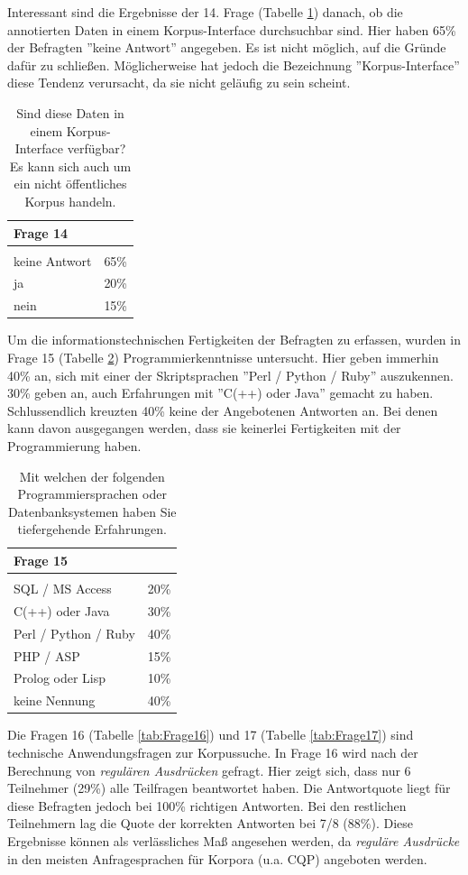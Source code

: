 Interessant sind die Ergebnisse der 14. Frage (Tabelle \ref{tab:Frage14}) danach, ob die annotierten Daten in einem Korpus-Interface durchsuchbar sind. Hier haben 65\% der Befragten ''keine Antwort'' angegeben. Es ist nicht möglich, auf die Gründe dafür zu schließen. Möglicherweise hat jedoch die Bezeichnung ''Korpus-Interface'' diese Tendenz verursacht, da sie nicht geläufig zu sein scheint.

	\begin{table}[H]
		\centering
		\begin{tabular}{l | r}
					Frage 14 &  \\
					\hline\\
					keine Antwort	& 65\% \\
					ja 			& 20\% \\
					nein			& 15\%
		\end{tabular}
		\caption{Sind diese Daten in einem Korpus-Interface verfügbar? Es kann sich auch um ein nicht öffentliches Korpus handeln.} \label{tab:Frage14}
	\end{table}
	
Um die informationstechnischen Fertigkeiten der Befragten zu erfassen, wurden in Frage 15 (Tabelle \ref{tab:Frage15}) Programmierkenntnisse untersucht. Hier geben immerhin 40\% an, sich mit einer der Skriptsprachen ''Perl / Python / Ruby'' auszukennen. 30\% geben an, auch Erfahrungen mit ''C(++) oder Java'' gemacht zu haben. Schlussendlich kreuzten 40\% keine der Angebotenen Antworten an. Bei denen kann davon ausgegangen werden, dass sie keinerlei Fertigkeiten mit der Programmierung haben.
	
	\begin{table}[H]
		\centering
		\begin{tabular}{l | r}
					Frage 15 &  \\
					\hline\\
					SQL / MS Access	& 20\% \\
					C(++) oder Java  	& 30\% \\
					Perl / Python / Ruby	& 40\% \\
					PHP / ASP		& 15\% \\
					Prolog oder Lisp	& 10\% \\
					keine Nennung	& 40\%
		\end{tabular}
		\caption{Mit welchen der folgenden Programmiersprachen oder Datenbanksystemen haben Sie tiefergehende Erfahrungen.} \label{tab:Frage15}
	\end{table}
	
	
Die Fragen 16 (Tabelle \ref{tab:Frage16}) und 17 (Tabelle \ref{tab:Frage17}) sind technische Anwendungsfragen zur Korpussuche. In Frage 16 wird nach der Berechnung von \emph{regulären Ausdrücken} gefragt. Hier zeigt sich, dass nur 6 Teilnehmer (29\%) alle Teilfragen beantwortet haben. Die Antwortquote liegt für diese Befragten jedoch bei 100\% richtigen Antworten. Bei den restlichen Teilnehmern lag die Quote der korrekten Antworten bei 7/8 (88\%). Diese Ergebnisse können als verlässliches Maß angesehen werden, da \emph{reguläre Ausdrücke} in den meisten Anfragesprachen für Korpora (u.a. CQP) angeboten werden.

